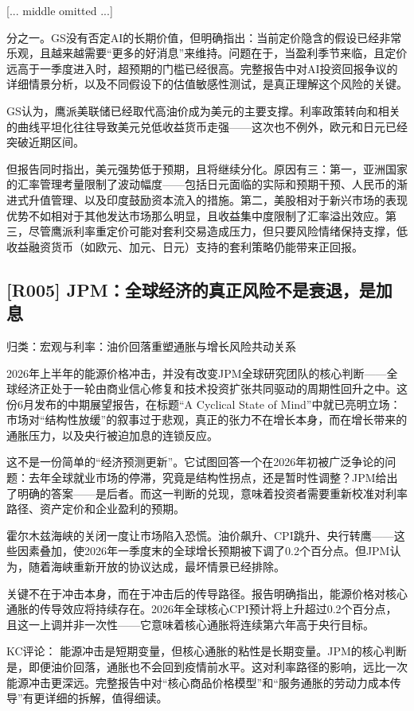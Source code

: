 \documentclass[11pt]{ctexart}
\begin{document}
[... middle omitted ...]

分之一。GS没有否定AI的长期价值，但明确指出：当前定价隐含的假设已经非常乐观，且越来越需要“更多的好消息”来维持。问题在于，当盈利季节来临，且定价远高于一季度进入时，超预期的门槛已经很高。完整报告中对AI投资回报争议的详细情景分析，以及不同假设下的估值敏感性测试，是真正理解这个风险的关键。

GS认为，鹰派美联储已经取代高油价成为美元的主要支撑。利率政策转向和相关的曲线平坦化往往导致美元兑低收益货币走强——这次也不例外，欧元和日元已经突破近期区间。

但报告同时指出，美元强势低于预期，且将继续分化。原因有三：第一，亚洲国家的汇率管理考量限制了波动幅度——包括日元面临的实际和预期干预、人民币的渐进式升值管理、以及印度鼓励资本流入的措施。第二，美股相对于新兴市场的表现优势不如相对于其他发达市场那么明显，且收益集中度限制了汇率溢出效应。第三，尽管鹰派利率重定价可能对套利交易造成压力，但只要风险情绪保持支撑，低收益融资货币（如欧元、加元、日元）支持的套利策略仍能带来正回报。

\subsection{[R005] JPM：全球经济的真正风险不是衰退，是加息}
{\small\color{refgray}归类：宏观与利率：油价回落重塑通胀与增长风险共动关系}

2026年上半年的能源价格冲击，并没有改变JPM全球研究团队的核心判断——全球经济正处于一轮由商业信心修复和技术投资扩张共同驱动的周期性回升之中。这份6月发布的中期展望报告，在标题“A Cyclical State of Mind”中就已亮明立场：市场对“结构性放缓”的叙事过于悲观，真正的张力不在增长本身，而在增长带来的通胀压力，以及央行被迫加息的连锁反应。

这不是一份简单的“经济预测更新”。它试图回答一个在2026年初被广泛争论的问题：去年全球就业市场的停滞，究竟是结构性拐点，还是暂时性调整？JPM给出了明确的答案——是后者。而这一判断的兑现，意味着投资者需要重新校准对利率路径、资产定价和企业盈利的预期。

霍尔木兹海峡的关闭一度让市场陷入恐慌。油价飙升、CPI跳升、央行转鹰——这些因素叠加，使2026年一季度末的全球增长预期被下调了0.2个百分点。但JPM认为，随着海峡重新开放的协议达成，最坏情景已经排除。

关键不在于冲击本身，而在于冲击后的传导路径。报告明确指出，能源价格对核心通胀的传导效应将持续存在。2026年全球核心CPI预计将上升超过0.2个百分点，且这一上调并非一次性——它意味着核心通胀将连续第六年高于央行目标。

KC评论： 能源冲击是短期变量，但核心通胀的粘性是长期变量。JPM的核心判断是，即便油价回落，通胀也不会回到疫情前水平。这对利率路径的影响，远比一次能源冲击更深远。完整报告中对“核心商品价格模型”和“服务通胀的劳动力成本传导”有更详细的拆解，值得细读。
\end{document}
